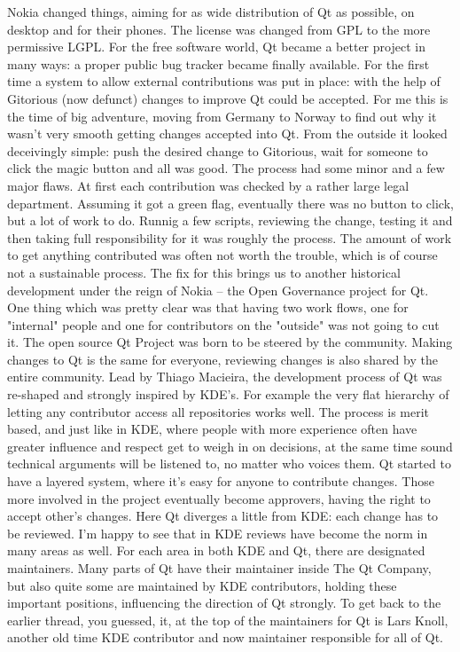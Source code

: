 Nokia changed things, aiming for as wide distribution of Qt as possible, on desktop and for their phones. The license was changed from GPL to the more permissive LGPL. For the free software world, Qt became a better project in many ways: a proper public bug tracker became finally available. For the first time a system to allow external contributions was put in place: with the help of Gitorious (now defunct) changes to improve Qt could be accepted. For me this is the time of big adventure, moving from Germany to Norway to find out why it wasn't very smooth getting changes accepted into Qt. From the outside it looked deceivingly simple: push the desired change to Gitorious, wait for someone to click the magic button and all was good. The process had some minor and a few major flaws. At first each contribution was checked by a rather large legal department. Assuming it got a green flag, eventually there was no button to click, but a lot of work to do. Runnig a few scripts, reviewing the change, testing it and then taking full responsibility for it was roughly the process. The amount of work to get anything contributed was often not worth the trouble, which is of course not a sustainable process. The fix for this brings us to another historical development under the reign of Nokia – the Open Governance project for Qt. One thing which was pretty clear was that having two work flows, one for "internal" people and one for contributors on the "outside" was not going to cut it. The open source Qt Project was born to be steered by the community. Making changes to Qt is the same for everyone, reviewing changes is also shared by the entire community. Lead by Thiago Macieira, the development process of Qt was re-shaped and strongly inspired by KDE’s. For example the very flat hierarchy of letting any contributor access all repositories works well. The process is merit based, and just like in KDE, where people with more experience often have greater influence and respect get to weigh in on decisions, at the same time sound technical arguments will be listened to, no matter who voices them. Qt started to have a layered system, where it’s easy for anyone to contribute changes. Those more involved in the project eventually become approvers, having the right to accept other’s changes. Here Qt diverges a little from KDE: each change has to be reviewed. I'm happy to see that in KDE reviews have become the norm in many areas as well. For each area in both KDE and Qt, there are designated maintainers. Many parts of Qt have their maintainer inside The Qt Company, but also quite some are maintained by KDE contributors, holding these important positions, influencing the direction of Qt strongly. To get back to the earlier thread, you guessed, it, at the top of the maintainers for Qt is Lars Knoll, another old time KDE contributor and now maintainer responsible for all of Qt.

